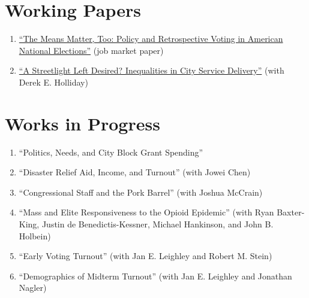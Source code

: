 \documentclass[12pt]{article}
\begin{document}



\section*{Working Papers}

\begin{enumerate}[topsep = 0pt, itemsep = 1ex, partopsep  = 1ex, parsep = 1ex]

	\item[] \href{https://www.brianhamel.me/files/new_deal.pdf}{``The Means Matter, Too: Policy and Retrospective Voting in American National Elections''} (job market paper)
	
	\item[] \href{https://www.brianhamel.me/files/311.pdf}{``A Streetlight Left Desired? Inequalities in City Service Delivery''} (with Derek E. Holliday)
	
\end{enumerate}
	
\section*{Works in Progress}

\begin{enumerate}[topsep = 0pt, itemsep = 1ex, partopsep  = 1ex, parsep = 1ex]
	
	\item[] ``Politics, Needs, and City Block Grant Spending''
	
	\item[] ``Disaster Relief Aid, Income, and Turnout'' (with Jowei Chen)
	
	\item[] ``Congressional Staff and the Pork Barrel'' (with Joshua McCrain)
	
	\item[] ``Mass and Elite Responsiveness to the Opioid Epidemic'' (with Ryan Baxter-King, Justin de Benedictis-Kessner, Michael Hankinson, and John B. Holbein)
	
	\item[] ``Early Voting Turnout'' (with Jan E. Leighley and Robert M. Stein)
	
	\item[] ``Demographics of Midterm Turnout'' (with Jan E. Leighley and Jonathan Nagler)

\end{enumerate}
\end{document}

